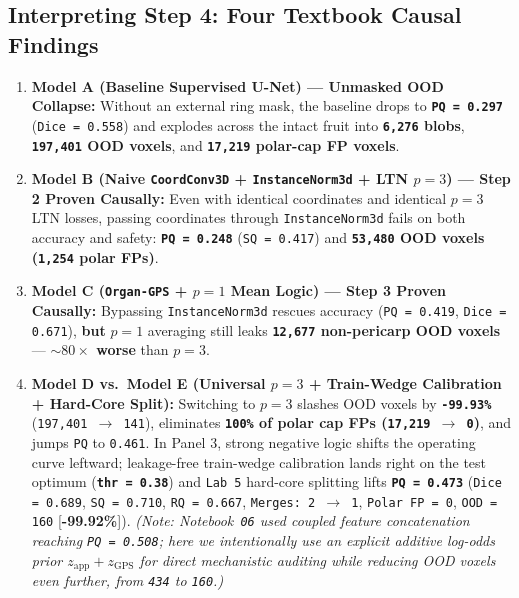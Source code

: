 \documentclass[10pt,a4paper]{article}
\begin{document}
\subsection*{Interpreting Step 4: Four Textbook Causal Findings}
\begin{enumerate}
    \item \textbf{Model A (Baseline Supervised U-Net) --- Unmasked OOD Collapse:} Without an external ring mask, the baseline drops to \textbf{\texttt{PQ = 0.297}} (\texttt{Dice = 0.558}) and explodes across the intact fruit into \textbf{\texttt{6,276} blobs}, \textbf{\texttt{197,401} OOD voxels}, and \textbf{\texttt{17,219} polar-cap FP voxels}.
    \item \textbf{Model B (Naive \texttt{CoordConv3D} + \texttt{InstanceNorm3d} + LTN $p=3$) --- Step 2 Proven Causally:} Even with identical coordinates and identical $p=3$ LTN losses, passing coordinates through \texttt{InstanceNorm3d} fails on both accuracy and safety: \textbf{\texttt{PQ = 0.248}} (\texttt{SQ = 0.417}) and \textbf{\texttt{53,480} OOD voxels (\texttt{1,254} polar FPs)}.
    \item \textbf{Model C (\texttt{Organ-GPS} + $p=1$ Mean Logic) --- Step 3 Proven Causally:} Bypassing \texttt{InstanceNorm3d} rescues accuracy (\texttt{PQ = 0.419}, \texttt{Dice = 0.671}), \textbf{but} $p=1$ averaging still leaks \textbf{\texttt{12,677} non-pericarp OOD voxels} --- \textbf{$\sim 80\times$ worse} than $p=3$.
    \item \textbf{Model D vs.\ Model E (Universal $p=3$ + Train-Wedge Calibration + Hard-Core Split):} Switching to $p=3$ slashes OOD voxels by \textbf{\texttt{-99.93\%}} (\texttt{197,401 $\to$ 141}), eliminates \textbf{\texttt{100\%} of polar cap FPs (\texttt{17,219 $\to$ 0})}, and jumps \texttt{PQ} to \texttt{0.461}. In Panel 3, strong negative logic shifts the operating curve leftward; leakage-free train-wedge calibration lands right on the test optimum (\textbf{\texttt{thr = 0.38}}) and \texttt{Lab 5} hard-core splitting lifts \textbf{\texttt{PQ = 0.473}} (\texttt{Dice = 0.689}, \texttt{SQ = 0.710}, \texttt{RQ = 0.667}, \texttt{Merges: 2 $\to$ 1}, \texttt{Polar FP = 0}, \texttt{OOD = 160} [\textbf{-99.92\%}]). \textit{(Note: Notebook~\texttt{06} used coupled feature concatenation reaching \texttt{PQ = 0.508}; here we intentionally use an explicit additive log-odds prior $z_{\text{app}} + z_{\text{GPS}}$ for direct mechanistic auditing while reducing OOD voxels even further, from \texttt{434} to \texttt{160}.)}
\end{enumerate}
\end{document}
